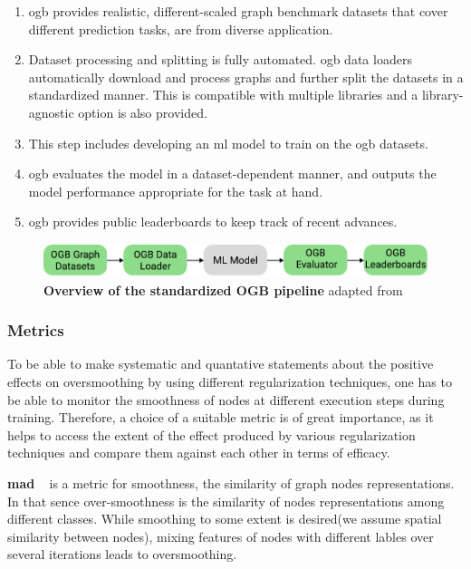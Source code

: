 \begin{enumerate}
    \item \Ac{ogb} provides realistic, different-scaled graph benchmark datasets that cover different prediction tasks, are from diverse application.
    \item Dataset processing and splitting is fully automated. \Ac{ogb} data loaders automatically download and process graphs and further split the datasets in a standardized manner. This is compatible with multiple libraries and a library-agnostic option is also provided.
    \item This step includes developing an \ac{ml} model to train on the ogb datasets.
    \item  \Ac{ogb} evaluates the model in a dataset-dependent manner, and outputs the model performance appropriate for the task at hand.
    \item \Ac{ogb} provides public leaderboards to keep track of recent advances.
\end{enumerate}

\begin{figure}[H]
    \centering
    \includegraphics[width= 0.90\linewidth]{gfx/implementation/OGB_pipeline}
    \caption{\textbf{Overview of the standardized OGB pipeline} adapted from \cite{Hu2020}}\label{fig:implement:pipeline}
\end{figure}


\subsubsection{Metrics}
\label{sec:implement:setup:choice:metrics}
To be able to make systematic and quantative statements about the positive effects on oversmoothing by using different regularization techniques, one has to be able to monitor the smoothness of nodes at different execution steps during training. Therefore, a choice of a suitable metric is of great importance, as it helps to access the extent of the effect produced by various regularization techniques and compare them against each other in terms of efficacy.

\textbf{\Ac{mad}} ~\cite{Chen2020} is a metric for smoothness, the similarity of graph nodes representations. In that sence over-smoothness is the similarity of nodes representations among different classes.
While smoothing to some extent is desired(we assume spatial similarity between nodes), mixing features of nodes with different lables over several iterations leads to oversmoothing.

